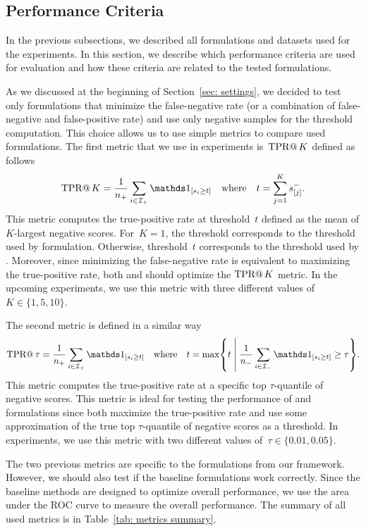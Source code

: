 \subsection{Performance Criteria}\label{sec: performance criteria}

In the previous subsections, we described all formulations and datasets used for the experiments. In this section, we describe which performance criteria are used for evaluation and how these criteria are related to the tested formulations.

As we discussed at the beginning of Section~\ref{sec: settings}, we decided to test only formulations that minimize the false-negative rate (or a combination of false-negative and false-positive rate) and use only negative samples for the threshold computation. This choice allows us to use simple metrics to compare used formulations. The first metric that we use in experiments is~$\operatorname{TPR@}K$ defined as follows
\begin{equation*}
  \tpratk = \frac{1}{\npos} \sum_{i \in \Ipos} \Iverson{s_i \geq t} \quad \text{where} \quad t = \sum_{j = 1}^{K} s^{-}_{[j]}.
\end{equation*}
This metric computes the true-positive rate at threshold~$t$ defined as the mean of $K$-largest negative scores. For~$K = 1$, the threshold corresponds to the threshold used by \TopPush formulation. Otherwise, threshold~$t$ corresponds to the threshold used by \TopPushK. Moreover, since minimizing the false-negative rate is equivalent to maximizing the true-positive rate, both \TopPush and \TopPushK should optimize the $\operatorname{TPR@}K$ metric. In the upcoming experiments, we use this metric with three different values of~$K \in \{1, 5, 10\}.$

The second metric is defined in a similar way
\begin{equation*}
  \tpratfpr = \frac{1}{\npos} \sum_{i \in \Ipos} \Iverson{s_i \geq t} \quad \text{where} \quad t
  = \max \Set{t}{\frac{1}{\nneg} \sum_{i \in \Ineg} \Iverson{s_i \geq t} \geq \tau}.
\end{equation*}
This metric computes the true-positive rate at a specific top $\tau$-quantile of negative scores. This metric is ideal for testing the performance of \tauFPL and \PatMatNP formulations since both maximize the true-positive rate and use some approximation of the true top $\tau$-quantile of negative scores as a threshold. In experiments, we use this metric with two different values of~$\tau \in \{0.01, 0.05\}.$

The two previous metrics are specific to the formulations from our framework. However, we should also test if the baseline formulations work correctly. Since the baseline methods are designed to optimize overall performance, we use the area under the ROC curve to measure the overall performance. The summary of all used metrics is in Table~\ref{tab: metrics summary}.

